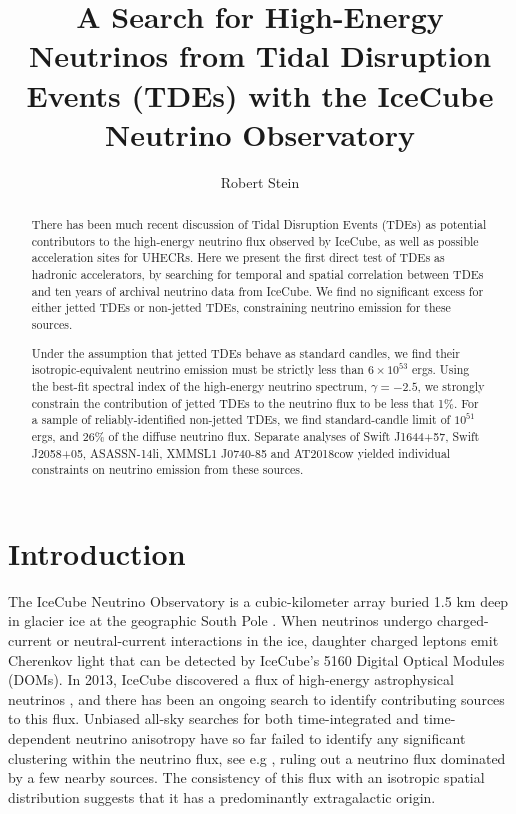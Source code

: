 \documentclass[twocolumn, tighten, linenumbers]{aastex62}
\begin{document}
\title{A Search for High-Energy Neutrinos from Tidal Disruption Events (TDEs) with the IceCube Neutrino Observatory}

\author{Robert Stein}

\begin{abstract}
There has been much recent discussion of Tidal Disruption Events (TDEs) as potential contributors to the high-energy neutrino flux observed by IceCube, as well as possible acceleration sites for UHECRs. Here we present the first direct test of TDEs as hadronic accelerators, by searching for temporal and spatial correlation between TDEs and ten years of archival neutrino data from IceCube. We find no significant excess for either jetted TDEs or non-jetted TDEs, constraining neutrino emission for these sources. 

Under the assumption that jetted TDEs behave as standard candles, we find their isotropic-equivalent neutrino emission must be strictly less than $6 \times 10^{53} $ ergs.  Using the best-fit spectral index of the high-energy neutrino spectrum, $\gamma=-2.5$, we strongly constrain the contribution of jetted TDEs to the neutrino flux to be less that 1\%.  For a sample of reliably-identified non-jetted TDEs, we find standard-candle limit of $10^{51} $ ergs, and 26\% of the diffuse neutrino flux. Separate analyses of Swift J1644+57, Swift J2058+05, ASASSN-14li, XMMSL1 J0740-85 and AT2018cow yielded individual constraints on neutrino emission from these sources.
\end{abstract}


\section{Introduction} 
\label{sec:introduction}
The IceCube Neutrino Observatory is a cubic-kilometer array buried 1.5 km deep in glacier ice at the geographic South Pole \cite{Aartsen:2016nxy}. When neutrinos undergo charged-current  or neutral-current interactions in the ice, daughter charged leptons emit Cherenkov light that can be detected by IceCube's 5160 Digital Optical Modules (DOMs). In 2013, IceCube discovered a flux of high-energy astrophysical neutrinos \citep{Aartsen:2015knd, Aartsen:2013jdh}, and there has been an ongoing search to identify contributing sources to this flux. Unbiased all-sky searches for both time-integrated and time-dependent neutrino anisotropy have so far failed to identify any significant clustering within the neutrino flux, see e.g  \citep{Aartsen:2016oji}, ruling out a neutrino flux dominated by a few nearby sources. The consistency of this flux with an isotropic spatial distribution suggests that it has a predominantly extragalactic origin.
\end{document}
